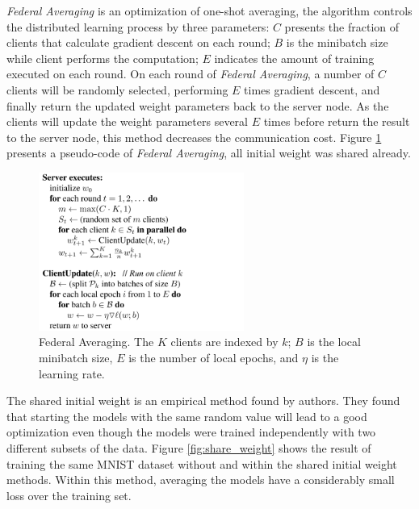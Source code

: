 \documentclass[article]{aaltoseries}
\begin{document}
\emph{Federal Averaging} is an optimization of one-shot averaging, the algorithm controls the distributed learning process by
three parameters: $C$ presents the fraction of clients that calculate gradient descent on each round; $B$ is the minibatch size
while client performs the computation; $E$ indicates the amount of training executed on each round.
On each round of \emph{Federal Averaging}, a number of $C$ clients will be randomly selected, performing $E$ times gradient
descent, and finally return the updated weight parameters back to the server node. As the clients will update the 
weight parameters several $E$ times before return the result to the server node, this method decreases the communication cost.
Figure \ref{alg:FederalAveragingAlgorithm} presents a pseudo-code of \emph{Federal Averaging}, all initial weight was shared already.


\begin{figure}[t!]
  \begin{center}
    \includegraphics[width=0.6\textwidth]{figures/Algorithm}
    \caption{Federal Averaging. The $K$ clients are indexed by $k$; $B$ is the local minibatch size, 
            $E$ is the number of local epochs, and $η$ is the learning rate.}
    \label{alg:FederalAveragingAlgorithm}
  \end{center}
\end{figure}


The shared initial weight is an empirical method found by authors. They found that starting the models with the same random
value will lead to a good optimization even though the models were trained independently with two different subsets of the data.
Figure \ref{fig:share_weight} shows the result of training the same MNIST dataset \cite{lecun2010mnist} without and within the 
shared initial weight methods. 
Within this method, averaging the models have a considerably small loss over the training set.
\end{document}
